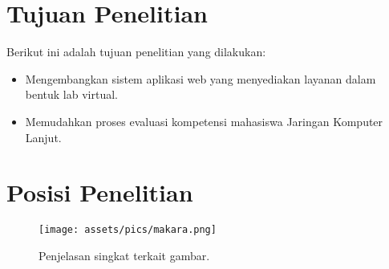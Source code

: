 \section{Tujuan Penelitian}
\label{sec:tujuan}
Berikut ini adalah tujuan penelitian yang dilakukan:
\begin{itemize}
	\item Mengembangkan sistem aplikasi web yang menyediakan layanan dalam bentuk lab virtual.
	\item Memudahkan proses evaluasi kompetensi mahasiswa Jaringan Komputer Lanjut.
\end{itemize}


\section{Posisi Penelitian}
\label{sec:posisiPenelitian}

\begin{figure}
	\centering
	\texttt{[image: assets/pics/makara.png]}
	\caption{Penjelasan singkat terkait gambar.}
	\label{fig:research_position}
\end{figure}

\noindent{}


